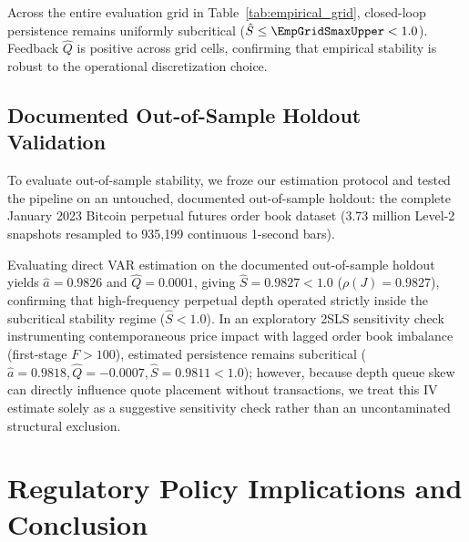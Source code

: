 \documentclass[12pt]{article}
\theoremstyle{definition}
\theoremstyle{remark}
\begin{document}
\begin{table}[htbp]
\centering
\caption{\textbf{Sensitivity of Empirical Feedback Invariants to Sampling Frequency ($\Delta$) and Horizon Window ($W$).}
Estimated persistence $\hat{S}$, feedback parameter $\hat{Q}$, and loop ratio $\hat{\mathcal{L}}$ across sampling intervals $\Delta \in \{1\text{s}, 10\text{s}, 60\text{s}\}$ and moving average window lengths $W \in \{60\text{s}, 300\text{s}, 900\text{s}\}$. Here $a_{\text{EMA}}$ denotes the mechanical filter anchor, distinct from the empirical return autoregression $\hat{J}_{11}$. 95\% confidence intervals in brackets.}
\label{tab:empirical_grid}
\resizebox{\textwidth}{!}{%
%
}
\end{table}

Across the entire evaluation grid in Table~\ref{tab:empirical_grid}, closed-loop persistence remains uniformly subcritical ($\hat{S} \le \EmpGridSmaxUpper < 1.0$). Feedback $\hat{Q}$ is positive across \EmpGridQallPositive{} grid cells, confirming that empirical stability is robust to the operational discretization choice.

\subsection{Documented Out-of-Sample Holdout Validation}
To evaluate out-of-sample stability, we froze our estimation protocol and tested the pipeline on an untouched, documented out-of-sample holdout: the complete January 2023 Bitcoin perpetual futures order book dataset (3.73 million Level-2 snapshots resampled to 935,199 continuous 1-second bars).

Evaluating direct VAR estimation on the documented out-of-sample holdout yields $\hat{a} = 0.9826$ and $\hat{Q} = 0.0001$, giving $\hat{S} = 0.9827 < 1.0$ ($\rho(J) = 0.9827$), confirming that high-frequency perpetual depth operated strictly inside the subcritical stability regime ($\hat{S} < 1.0$). In an exploratory 2SLS sensitivity check instrumenting contemporaneous price impact with lagged order book imbalance (first-stage $F > 100$), estimated persistence remains subcritical ($\hat{a} = 0.9818, \hat{Q} = -0.0007, \hat{S} = 0.9811 < 1.0$); however, because depth queue skew can directly influence quote placement without transactions, we treat this IV estimate solely as a suggestive sensitivity check rather than an uncontaminated structural exclusion.

\enlargethispage{10\baselineskip}
\section{Regulatory Policy Implications and Conclusion}
\label{sec:policy_conclusion}
\end{document}
